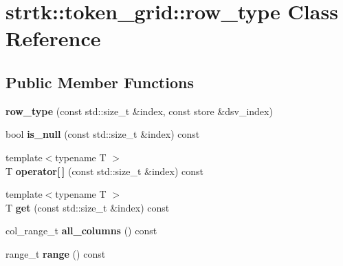 \hypertarget{classstrtk_1_1token__grid_1_1row__type}{\section{strtk\-:\-:token\-\_\-grid\-:\-:row\-\_\-type Class Reference}
\label{classstrtk_1_1token__grid_1_1row__type}
}
\subsection*{Public Member Functions}
\begin{DoxyCompactItemize}
\item 
\hypertarget{classstrtk_1_1token__grid_1_1row__type_a56f138d13100bda1afa61a4979a02e21}{{\bfseries row\-\_\-type} (const std\-::size\-\_\-t \&index, const store \&dsv\-\_\-index)}\label{classstrtk_1_1token__grid_1_1row__type_a56f138d13100bda1afa61a4979a02e21}

\item 
\hypertarget{classstrtk_1_1token__grid_1_1row__type_aa823e12f7aea422bcb63906ad2f8759d}{bool {\bfseries is\-\_\-null} (const std\-::size\-\_\-t \&index) const }\label{classstrtk_1_1token__grid_1_1row__type_aa823e12f7aea422bcb63906ad2f8759d}

\item 
\hypertarget{classstrtk_1_1token__grid_1_1row__type_a1214525f909f85a07168c1b143cfa290}{{\footnotesize template$<$typename T $>$ }\\T {\bfseries operator\mbox{[}$\,$\mbox{]}} (const std\-::size\-\_\-t \&index) const }\label{classstrtk_1_1token__grid_1_1row__type_a1214525f909f85a07168c1b143cfa290}

\item 
\hypertarget{classstrtk_1_1token__grid_1_1row__type_a68872f83287df823e7a242ef4472c4ae}{{\footnotesize template$<$typename T $>$ }\\T {\bfseries get} (const std\-::size\-\_\-t \&index) const }\label{classstrtk_1_1token__grid_1_1row__type_a68872f83287df823e7a242ef4472c4ae}

\item 
\hypertarget{classstrtk_1_1token__grid_1_1row__type_a76c620f9867e214a5ab39e613c8d3396}{col\-\_\-range\-\_\-t {\bfseries all\-\_\-columns} () const }\label{classstrtk_1_1token__grid_1_1row__type_a76c620f9867e214a5ab39e613c8d3396}

\item 
\hypertarget{classstrtk_1_1token__grid_1_1row__type_a8902d09b9dc83034ea3fbca61e4be868}{range\-\_\-t {\bfseries range} () const }\label{classstrtk_1_1token__grid_1_1row__type_a8902d09b9dc83034ea3fbca61e4be868}


\end{DoxyCompactItemize}

